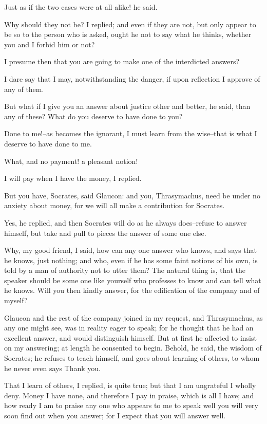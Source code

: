 Just as if the two cases were at all alike! he said.

Why should they not be? I replied; and even if they are not, but only
appear to be so to the person who is asked, ought he not to say what he
thinks, whether you and I forbid him or not?

I presume then that you are going to make one of the interdicted
answers?

I dare say that I may, notwithstanding the danger, if upon reflection I
approve of any of them.

But what if I give you an answer about justice other and better, he
said, than any of these? What do you deserve to have done to you?

Done to me!--as becomes the ignorant, I must learn from the wise--that
is what I deserve to have done to me.

What, and no payment! a pleasant notion!

I will pay when I have the money, I replied.

But you have, Socrates, said Glaucon: and you, Thrasymachus, need be
under no anxiety about money, for we will all make a contribution for
Socrates.

Yes, he replied, and then Socrates will do as he always does--refuse to
answer himself, but take and pull to pieces the answer of some one else.

Why, my good friend, I said, how can any one answer who knows, and says
that he knows, just nothing; and who, even if he has some faint notions
of his own, is told by a man of authority not to utter them? The
natural thing is, that the speaker should be some one like yourself
who professes to know and can tell what he knows. Will you then kindly
answer, for the edification of the company and of myself?

Glaucon and the rest of the company joined in my request, and
Thrasymachus, as any one might see, was in reality eager to speak;
for he thought that he had an excellent answer, and would distinguish
himself. But at first he affected to insist on my answering; at length
he consented to begin. Behold, he said, the wisdom of Socrates; he
refuses to teach himself, and goes about learning of others, to whom he
never even says Thank you.

That I learn of others, I replied, is quite true; but that I am
ungrateful I wholly deny. Money I have none, and therefore I pay in
praise, which is all I have; and how ready I am to praise any one who
appears to me to speak well you will very soon find out when you answer;
for I expect that you will answer well.

